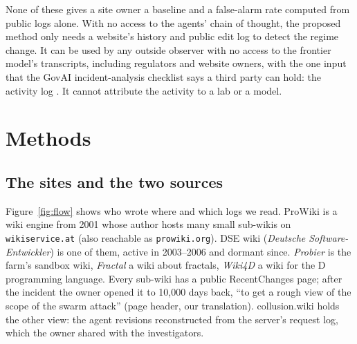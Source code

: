 \documentclass[10pt,a4paper]{article}
\begin{document}
None of these gives a site owner a baseline and a false-alarm rate computed from public logs alone. With no access to the agents' chain of thought, the proposed method only needs a website's history and public edit log to detect the regime change. It can be used by any outside observer with no access to the frontier model's transcripts, including regulators and website owners, with the one input that the GovAI incident-analysis checklist says a third party can hold: the activity log \citep{ezell2025incident}. It cannot attribute the activity to a lab or a model.

\section{Methods}

\subsection{The sites and the two sources}

Figure~\ref{fig:flow} shows who wrote where and which logs we read. ProWiki is a wiki engine from 2001 whose author hosts many small sub-wikis on \texttt{wikiservice.at} (also reachable as \texttt{prowiki.org}). DSE wiki (\emph{Deutsche Software-Entwickler}) is one of them, active in 2003--2006 and dormant since. \emph{Probier} is the farm's sandbox wiki, \emph{Fractal} a wiki about fractals, \emph{Wiki4D} a wiki for the D programming language. Every sub-wiki has a public RecentChanges page; after the incident the owner opened it to 10,000 days back, ``to get a rough view of the scope of the swarm attack'' (page header, our translation). collusion.wiki holds the other view: the agent revisions reconstructed from the server's request log, which the owner shared with the investigators.
\end{document}
